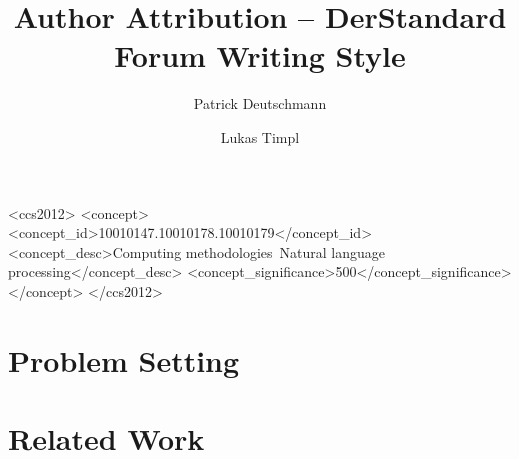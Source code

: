 \documentclass[acmsmall]{acmart}
\begin{document}
\title{Author Attribution – DerStandard Forum Writing Style}

\author{Patrick Deutschmann}

\author{Lukas Timpl}


\begin{abstract}
\end{abstract}

\begin{CCSXML}
<ccs2012>
   <concept>
       <concept_id>10010147.10010178.10010179</concept_id>
       <concept_desc>Computing methodologies~Natural language processing</concept_desc>
       <concept_significance>500</concept_significance>
       </concept>
 </ccs2012>
\end{CCSXML}



\maketitle

\section{Problem Setting}


\section{Related Work}
\end{document}
